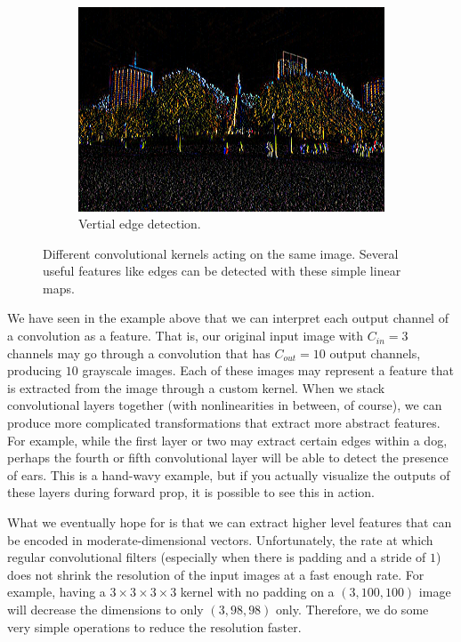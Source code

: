 \begin{example}
\begin{figure}[H]
\begin{subfigure}[b]{0.32\textwidth}
          \includegraphics[width=\textwidth]{img/03_CNN/Vertical.png}
          \caption{Vertial edge detection. }
          \label{fig:vertical_edge}
      \end{subfigure} 

      \caption{Different convolutional kernels acting on the same image. Several useful features like edges can be detected with these simple linear maps. }
      \label{fig:feature_extraction}
    \end{figure}
  \end{example}

  We have seen in the example above that we can interpret each output channel of a convolution as a feature. That is, our original input image with $C_{in} = 3$ channels may go through a convolution that has $C_{out} = 10$ output channels, producing $10$ grayscale images. Each of these images may represent a feature that is extracted from the image through a custom kernel. When we stack convolutional layers together (with nonlinearities in between, of course), we can produce more complicated transformations that extract more abstract features. For example, while the first layer or two may extract certain edges within a dog, perhaps the fourth or fifth convolutional layer will be able to detect the presence of ears. This is a hand-wavy example, but if you actually visualize the outputs of these layers during forward prop, it is possible to see this in action.  

  What we eventually hope for is that we can extract higher level features that can be encoded in moderate-dimensional vectors. Unfortunately, the rate at which regular convolutional filters (especially when there is padding and a stride of $1$) does not shrink the resolution of the input images at a fast enough rate. For example, having a $3 \times 3 \times 3 \times 3$ kernel with no padding on a $(3, 100, 100)$ image will decrease the dimensions to only $(3, 98, 98)$ only. Therefore, we do some very simple operations to reduce the resolution faster. 

